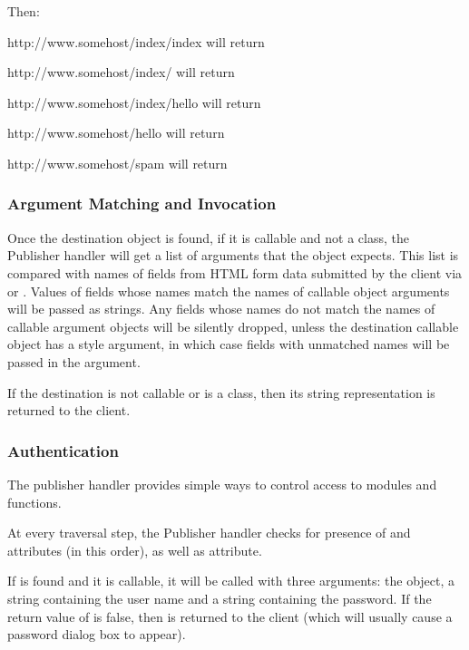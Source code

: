 Then:

http://www.somehost/index/index will return 

http://www.somehost/index/ will return 

http://www.somehost/index/hello will return 

http://www.somehost/hello will return 

http://www.somehost/spam will return 

\subsubsection{Argument Matching and Invocation\label{hand-pub-alg-args}}

Once the destination object is found, if it is callable and not a
class, the Publisher handler will get a list of arguments that the
object expects. This list is compared with names of fields from HTML
form data submitted by the client via  or
. Values of fields whose names match the names of callable
object arguments will be passed as strings. Any fields whose names do
not match the names of callable argument objects will be silently dropped,
unless the destination callable object has a  style
argument, in which case fields with unmatched names will be passed in the
 argument.

If the destination is not callable or is a class, then its string
representation is returned to the client.

\subsubsection{Authentication\label{hand-pub-alg-auth}}

The publisher handler provides simple ways to control access to
modules and functions.

At every traversal step, the Publisher handler checks for presence of
 and  attributes (in this order), as 
well as  attribute. 

If  is found and it is callable, it will be called
with three arguments: the  object, a string containing
the user name and a string containing the password. If the return
value of
 is false, then  is
returned to the client (which will usually cause a password dialog box
to appear).

